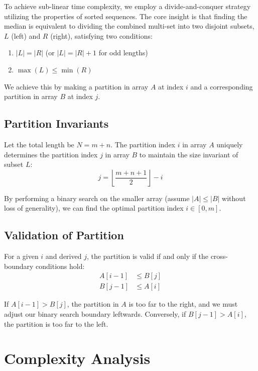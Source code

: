 \documentclass[10pt,journal,compsoc]{IEEEtran}
\begin{document}
To achieve sub-linear time complexity, we employ a divide-and-conquer strategy utilizing the properties of sorted sequences. The core insight is that finding the median is equivalent to dividing the combined multi-set into two disjoint subsets, $L$ (left) and $R$ (right), satisfying two conditions:
\begin{enumerate}
    \item $|L| = |R|$ (or $|L| = |R| + 1$ for odd lengths)
    \item $\max(L) \leq \min(R)$
\end{enumerate}

We achieve this by making a partition in array $A$ at index $i$ and a corresponding partition in array $B$ at index $j$. 

\subsection{Partition Invariants}

Let the total length be $N = m + n$. The partition index $i$ in array $A$ uniquely determines the partition index $j$ in array $B$ to maintain the size invariant of subset $L$:
\begin{equation}
j = \left\lfloor \frac{m + n + 1}{2} \right\rfloor - i
\end{equation}

By performing a binary search on the smaller array (assume $|A| \leq |B|$ without loss of generality), we can find the optimal partition index $i \in [0, m]$.

\subsection{Validation of Partition}

For a given $i$ and derived $j$, the partition is valid if and only if the cross-boundary conditions hold:
\begin{align}
A[i-1] &\leq B[j] \\
B[j-1] &\leq A[i]
\end{align}

If $A[i-1] > B[j]$, the partition in $A$ is too far to the right, and we must adjust our binary search boundary leftwards. Conversely, if $B[j-1] > A[i]$, the partition is too far to the left.

\section{Complexity Analysis}
\end{document}
